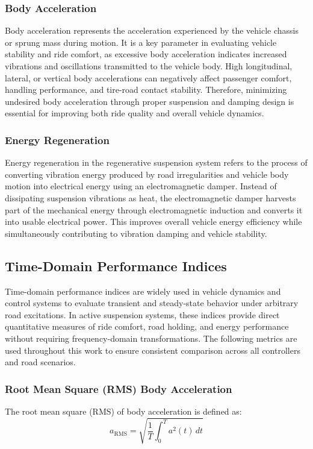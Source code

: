     \subsubsection{Body Acceleration}
   Body acceleration represents the acceleration experienced by the vehicle chassis or sprung mass during motion. It is a key parameter in evaluating vehicle stability and ride comfort, as excessive body acceleration indicates increased vibrations and oscillations transmitted to the vehicle body. High longitudinal, lateral, or vertical body accelerations can negatively affect passenger comfort, handling performance, and tire-road contact stability. Therefore, minimizing undesired body acceleration through proper suspension and damping design is essential for improving both ride quality and overall vehicle dynamics.
\subsubsection{Energy Regeneration}
 Energy regeneration in the regenerative suspension system refers to the process of converting vibration energy produced by road irregularities and vehicle body motion into electrical energy using an electromagnetic damper. Instead of dissipating suspension vibrations as heat, the electromagnetic damper harvests part of the mechanical energy through electromagnetic induction and converts it into usable electrical power. This improves overall vehicle energy efficiency while simultaneously contributing to vibration damping and vehicle stability.
 \subsection{Time-Domain Performance Indices}


Time-domain performance indices are widely used in vehicle dynamics and control systems to evaluate transient and steady-state behavior under arbitrary road excitations. In active suspension systems, these indices provide direct quantitative measures of ride comfort, road holding, and energy performance without requiring frequency-domain transformations. The following metrics are used throughout this work to ensure consistent comparison across all controllers and road scenarios.


\subsubsection{Root Mean Square (RMS) Body Acceleration}

The root mean square (RMS) of body acceleration is defined as:
\begin{equation}
a_{\mathrm{RMS}} = \sqrt{\frac{1}{T} \int_0^T a^2(t)\,dt}
\end{equation}

